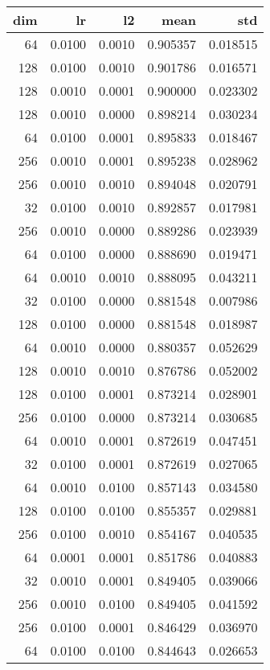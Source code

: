 \begin{tabular}{rrrrr}
\toprule
 dim &      lr &      l2 &      mean &       std \\
\midrule
  64 &  0.0100 &  0.0010 &  0.905357 &  0.018515 \\
 128 &  0.0100 &  0.0010 &  0.901786 &  0.016571 \\
 128 &  0.0010 &  0.0001 &  0.900000 &  0.023302 \\
 128 &  0.0010 &  0.0000 &  0.898214 &  0.030234 \\
  64 &  0.0100 &  0.0001 &  0.895833 &  0.018467 \\
 256 &  0.0010 &  0.0001 &  0.895238 &  0.028962 \\
 256 &  0.0010 &  0.0010 &  0.894048 &  0.020791 \\
  32 &  0.0100 &  0.0010 &  0.892857 &  0.017981 \\
 256 &  0.0010 &  0.0000 &  0.889286 &  0.023939 \\
  64 &  0.0100 &  0.0000 &  0.888690 &  0.019471 \\
  64 &  0.0010 &  0.0010 &  0.888095 &  0.043211 \\
  32 &  0.0100 &  0.0000 &  0.881548 &  0.007986 \\
 128 &  0.0100 &  0.0000 &  0.881548 &  0.018987 \\
  64 &  0.0010 &  0.0000 &  0.880357 &  0.052629 \\
 128 &  0.0010 &  0.0010 &  0.876786 &  0.052002 \\
 128 &  0.0100 &  0.0001 &  0.873214 &  0.028901 \\
 256 &  0.0100 &  0.0000 &  0.873214 &  0.030685 \\
  64 &  0.0010 &  0.0001 &  0.872619 &  0.047451 \\
  32 &  0.0100 &  0.0001 &  0.872619 &  0.027065 \\
  64 &  0.0010 &  0.0100 &  0.857143 &  0.034580 \\
 128 &  0.0100 &  0.0100 &  0.855357 &  0.029881 \\
 256 &  0.0100 &  0.0010 &  0.854167 &  0.040535 \\
  64 &  0.0001 &  0.0001 &  0.851786 &  0.040883 \\
  32 &  0.0010 &  0.0001 &  0.849405 &  0.039066 \\
 256 &  0.0010 &  0.0100 &  0.849405 &  0.041592 \\
 256 &  0.0100 &  0.0001 &  0.846429 &  0.036970 \\
  64 &  0.0100 &  0.0100 &  0.844643 &  0.026653 \\

\end{tabular}
